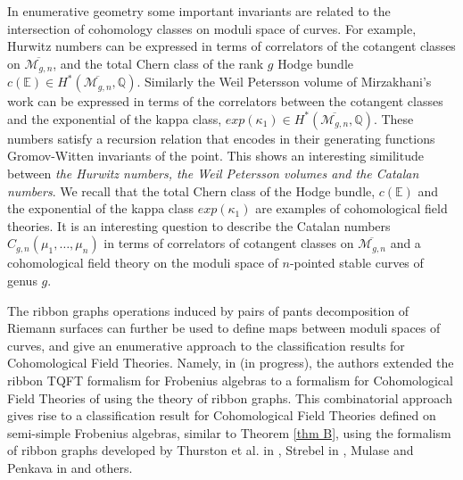 \documentclass{amsart}
\theoremstyle{definition}
\begin{document}
 In enumerative geometry some important invariants are related to the intersection of cohomology classes on moduli space of curves. 
For example, Hurwitz numbers can be expressed in terms of correlators of the cotangent classes on $\overline{\mathcal{M}_{g,n}}$,
and the total Chern class of the rank $g$ Hodge bundle  $c(\mathbb{E})\in H^*(\overline{\mathcal{M}_{g,n}},\mathbb{Q})$.  Similarly the Weil Petersson volume of Mirzakhani's work \cite{M_inventiones,M_jams} can be expressed in terms of the correlators between the cotangent classes and the exponential of the kappa class, $exp(\kappa_1)\in H^*(\overline{\mathcal{M}_{g,n}}, \mathbb{Q})$. These numbers satisfy a recursion relation that encodes in their generating functions Gromov-Witten invariants of the point. This shows an interesting similitude between {\it the Hurwitz numbers,  the Weil Petersson volumes and the Catalan numbers}. We recall that the total Chern class of the Hodge bundle, $c(\mathbb{E})$ and the exponential of the kappa class $exp(\kappa_1)$ are examples of cohomological field theories. It is an interesting question to describe the  Catalan numbers $C_{g,n}(\mu_1,\dots,\mu_n)$ in terms of correlators of
cotangent classes on $\overline{\mathcal{M}_{g,n}}$ and a cohomological field theory  on the moduli space of $n$-pointed stable curves of genus $g$.










The ribbon graphs operations induced by pairs of pants decomposition of Riemann surfaces can further be used to define maps between moduli spaces of curves, and give an enumerative approach to the classification results for Cohomological Field Theories. Namely, in \cite{DM3} (in progress), the authors extended the ribbon TQFT formalism for Frobenius algebras to a formalism for Cohomological Field Theories of \cite{KM} using the theory of ribbon graphs. This combinatorial approach gives rise to a classification result  for Cohomological Field Theories defined on semi-simple Frobenius algebras,
 similar to Theorem \ref{thm B}, using the formalism of ribbon graphs developed by Thurston et al. in \cite{STT}, Strebel in \cite{Strebel},  Mulase and Penkava in \cite{MP} and others.
\end{document}
